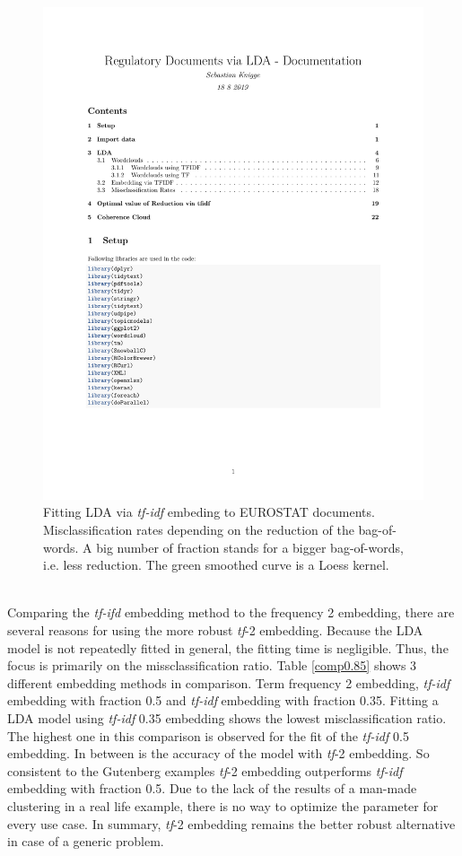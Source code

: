 \documentclass[11pt,a4paper]{article}
\begin{document}
\begin{figure}[!htbp]
	\centering
	\includegraphics[page=21, trim=68 400 10 70,clip,width=1.2\textwidth]{Docs_LDA_adapted.pdf}
	\caption{Fitting LDA via \textit{tf-idf} embeding to EUROSTAT documents. Misclassification rates depending on the reduction of the bag-of-words. A big number of fraction stands for a bigger bag-of-words, i.e. less reduction. The green smoothed curve is a Loess kernel.}
	\label{misc.ratio_tfidf}
\end{figure}
\ \\
Comparing the \textit{tf-ifd} embedding method to the frequency 2 embedding, there are several reasons for using the more robust \textit{tf}-2 embedding. Because the LDA model is not repeatedly fitted in general, the fitting time is negligible. Thus, the focus is primarily on the missclassification ratio. Table \ref{comp0.85} shows 3 different embedding methods in comparison. Term frequency 2 embedding, \textit{tf-idf} embedding with fraction 0.5 and \textit{tf-idf} embedding with fraction 0.35. Fitting a LDA model using \textit{tf-idf} 0.35 embedding shows the lowest misclassification ratio. The highest one in this comparison is observed for the fit of the \textit{tf-idf} 0.5 embedding. In between is the accuracy of the model with \textit{tf}-2 embedding. So consistent to the Gutenberg examples \textit{tf}-2 embedding outperforms \textit{tf-idf} embedding with fraction 0.5. Due to the lack of the results of a man-made clustering in a real life example, there is no way to optimize the parameter for every use case. In summary, \textit{tf}-2 embedding remains the better robust alternative in case of a generic problem.
\end{document}
